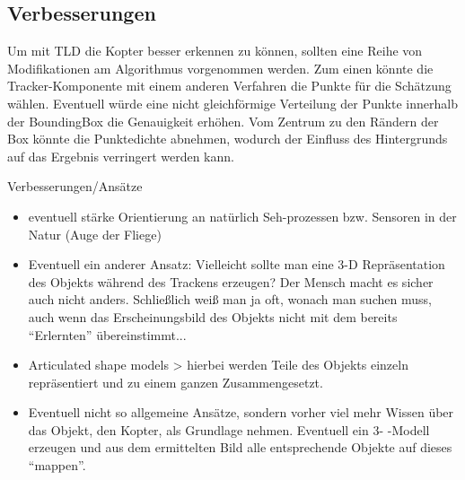 
\subsection{Verbesserungen}
Um mit TLD die Kopter besser erkennen zu können, sollten eine Reihe von Modifikationen am Algorithmus vorgenommen werden. Zum einen könnte die Tracker-Komponente mit einem anderen Verfahren die Punkte für die Schätzung wählen. Eventuell würde eine nicht gleichförmige Verteilung der Punkte innerhalb der BoundingBox die Genauigkeit erhöhen. Vom Zentrum zu den Rändern der Box könnte die Punktedichte abnehmen, wodurch der Einfluss des Hintergrunds auf das Ergebnis verringert werden kann.


Verbesserungen/Ansätze
\begin{itemize}
\item eventuell stärke Orientierung an natürlich Seh-prozessen bzw. Sensoren in der Natur (Auge der Fliege)
\item Eventuell ein anderer Ansatz: Vielleicht sollte man eine 3-D Repräsentation des Objekts während des Trackens erzeugen? Der Mensch macht es sicher auch nicht anders. Schließlich weiß man ja oft, wonach man suchen muss, auch wenn das Erscheinungsbild des Objekts nicht mit dem bereits ``Erlernten'' übereinstimmt...
\item Articulated shape models > hierbei werden Teile des Objekts einzeln repräsentiert und zu einem ganzen Zusammengesetzt. 
\item Eventuell nicht so allgemeine Ansätze, sondern vorher viel mehr Wissen über das Objekt, den Kopter, als Grundlage nehmen. Eventuell ein 3- -Modell erzeugen und aus dem ermittelten Bild alle entsprechende Objekte auf dieses ``mappen''. 
\end{itemize}